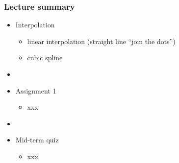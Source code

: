 \documentclass[english,14pt]{beamer}
\begin{document}
\begin{frame}[fragile]

\frametitle{Lecture summary}
\begin{itemize}
	\item Interpolation
	\begin{itemize}
		\item linear interpolation (straight line ``join the dots'')
		\item cubic spline
	\end{itemize}

	\item[]
	
	\item Assignment 1
	\begin{itemize}
		\item xxx
	\end{itemize}

	\item[]
	
	\item Mid-term quiz
		\begin{itemize}
			\item xxx
		\end{itemize}
		
\end{itemize}
\end{frame}
\end{document}

